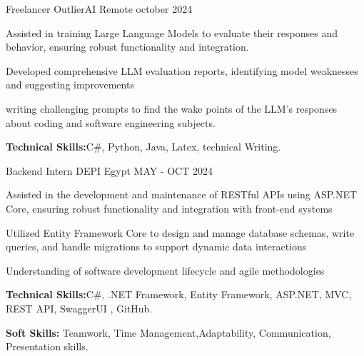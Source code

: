 

\begin{cventries}
  \cventry
    {Freelancer} %
    {OutlierAI} %
    {Remote} %
    {october 2024} %
    {
      \begin{cvitems} %
        \item {Assisted in training Large Language Models to evaluate their responses and behavior, ensuring robust functionality and integration.}
        \item {Developed comprehensive LLM evaluation reports, identifying model weaknesses and suggesting improvements}
        \item {writing challenging prompts to find the wake points of the LLM's responses about coding and software engineering subjects.}
        \item {\textbf{Technical Skills:}C\#, Python, Java, Latex, technical Writing.}
      \end{cvitems}
    }
  \cventry
    {Backend Intern} %
    {DEPI} %
    {Egypt} %
    {MAY - OCT 2024} %
    {
      \begin{cvitems} %
        \item { Assisted in the development and maintenance of RESTful APIs using ASP.NET Core, ensuring robust functionality and integration with front-end systems}
        \item {Utilized Entity Framework Core to design and manage database schemas, write queries, and handle migrations to support dynamic data interactions}
        \item {Understanding of software development lifecycle and agile methodologies}
        \item {\textbf{Technical Skills:}C\#, .NET Framework, Entity Framework, ASP.NET, MVC, REST API, SwaggerUI , GitHub.}
        \item {\textbf{Soft Skills:} Teamwork, Time Management,Adaptability,  Communication, Presentation skills.}
      \end{cvitems}
    }
    

\end{cventries}
